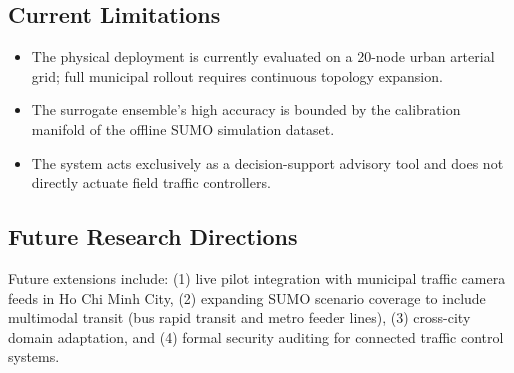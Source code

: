 \subsection{Current Limitations}
\begin{itemize}[leftmargin=1.5cm, label=--]
  \item The physical deployment is currently evaluated on a 20-node urban arterial grid; full municipal rollout requires continuous topology expansion.
  \item The surrogate ensemble's high accuracy is bounded by the calibration manifold of the offline SUMO simulation dataset.
  \item The system acts exclusively as a decision-support advisory tool and does not directly actuate field traffic controllers.
\end{itemize}

\subsection{Future Research Directions}
Future extensions include: (1) live pilot integration with municipal traffic camera feeds in Ho Chi Minh City, (2) expanding SUMO scenario coverage to include multimodal transit (bus rapid transit and metro feeder lines), (3) cross-city domain adaptation, and (4) formal security auditing for connected traffic control systems.

